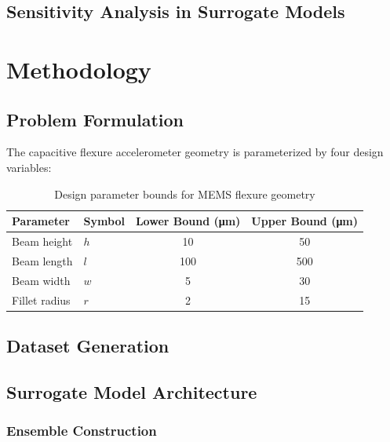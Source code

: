 \documentclass{elsarticle}
\begin{document}


\subsection{Sensitivity Analysis in Surrogate Models}


\section{Methodology}
\label{sec:methodology}

\subsection{Problem Formulation}

The capacitive flexure accelerometer geometry is parameterized by four design variables:

\begin{table}[htbp]
    \centering
    \caption{Design parameter bounds for MEMS flexure geometry}
    \label{tab:design_space}
    \begin{tabular}{llcc}
        \toprule
        Parameter     & Symbol & Lower Bound (\si{\micro\meter}) & Upper Bound (\si{\micro\meter}) \\
        \midrule
        Beam height   & \(h\)  & 10                              & 50                              \\
        Beam length   & \(l\)  & 100                             & 500                             \\
        Beam width    & \(w\)  & 5                               & 30                              \\
        Fillet radius & \(r\)  & 2                               & 15                              \\
        \bottomrule
    \end{tabular}
\end{table}

\subsection{Dataset Generation}

\subsection{Surrogate Model Architecture}

\subsubsection{Ensemble Construction}
\end{document}
